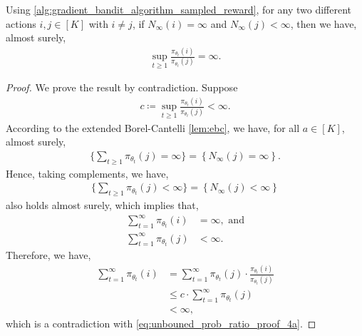 \begin{lemma}
\label{lem:unbouned_prob_ratio}
Using \cref{alg:gradient_bandit_algorithm_sampled_reward}, for any two different actions $i, j \in [K]$ with $i \ne j$, if $N_\infty(i) = \infty$ and $N_\infty(j) < \infty$, then we have, almost surely,
\begin{align}
    \sup_{t \ge 1}{ \frac{ \pi_{\theta_t}(i) }{  \pi_{\theta_t}(j) } } = \infty.
\end{align}
\end{lemma}
\begin{proof}
We prove the result by contradiction. Suppose
\begin{align}
\label{eq:unbouned_prob_ratio_proof_1}
    c \coloneqq \sup_{t \ge 1}{ \frac{ \pi_{\theta_t}(i) }{  \pi_{\theta_t}(j) } } < \infty.
\end{align}
According to the extended Borel-Cantelli \cref{lem:ebc}, we have, for all $a \in [K]$, almost surely,
\begin{align}
\label{eq:unbouned_prob_ratio_proof_2}
    \Big\{ \sum_{t \ge 1} \pi_{\theta_t}(j)=\infty \Big\} = \left\{ N_\infty(j)=\infty \right\}.
\end{align}
Hence, taking complements, we have,
\begin{align}
\label{eq:unbouned_prob_ratio_proof_3}
    \Big\{ \sum_{t \ge 1} \pi_{\theta_t}(j)<\infty \Big\} = \left\{N_\infty(j)<\infty\right\}
\end{align}
also holds almost surely, which implies that,
\begin{align}
\label{eq:unbouned_prob_ratio_proof_4a}
    \sum_{t=1}^{\infty} \pi_{\theta_t}(i) &= \infty, \text{ and} \\
\label{eq:unbouned_prob_ratio_proof_4b}
    \sum_{t=1}^{\infty} \pi_{\theta_t}(j) &< \infty.
\end{align}
Therefore, we have,
\begin{align}
\label{eq:unbouned_prob_ratio_proof_5}
    \sum_{t=1}^{\infty} \pi_{\theta_t}(i) &= \sum_{t=1}^{\infty} \pi_{\theta_t}(j) \cdot \frac{ \pi_{\theta_t}(i) }{ \pi_{\theta_t}(j) } \\
    &\le c \cdot \sum_{t=1}^{\infty} \pi_{\theta_t}(j) \\
    &< \infty,
\end{align}
which is a contradiction with \cref{eq:unbouned_prob_ratio_proof_4a}.
\end{proof}

